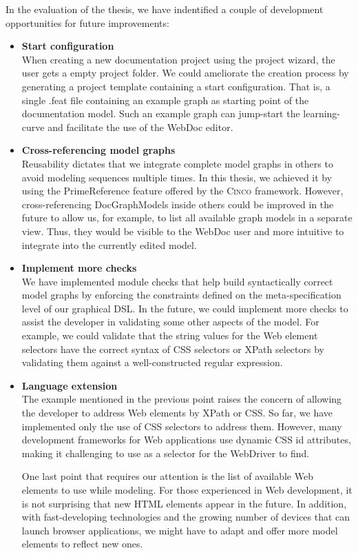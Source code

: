 In the evaluation of the thesis, we have indentified a couple of development opportunities for future improvements:
\begin{itemize}
    \item \textbf{Start configuration}\\
        When creating a new documentation project using the project wizard, the user gets a empty project folder. We could ameliorate the creation process by generating a project template containing a start configuration. That is, a single .feat file containing an example graph as starting point of the documentation model. Such an example graph can jump-start the learning-curve and facilitate the use of the WebDoc editor.
    \item \textbf{Cross-referencing model graphs}\\
        Reusability dictates that we integrate complete model graphs in others to avoid modeling sequences multiple times. In this thesis, we achieved it by using the PrimeReference feature offered by the \textsc{Cinco} framework. However, cross-referencing DocGraphModels inside others could be improved in the future to allow us, for example, to list all available graph models in a separate view. Thus, they would be visible to the WebDoc user and more intuitive to integrate into the currently edited model.
    \item \textbf{Implement more checks}\\
        We have implemented module checks that help build syntactically correct model graphs by enforcing the constraints defined on the meta-specification level of our graphical DSL. In the future, we could implement more checks to assist the developer in validating some other aspects of the model. For example, we could validate that the string values for the Web element selectors have the correct syntax of CSS selectors or XPath selectors by validating them against a well-constructed regular expression.
    \item \textbf{Language extension}\\
        The example mentioned in the previous point raises the concern of allowing the developer to address Web elements by XPath or CSS. So far, we have implemented only the use of CSS selectors to address them. However, many development frameworks for Web applications use dynamic CSS id attributes, making it challenging to use as a selector for the WebDriver to find. 

        One last point that requires our attention is the list of available Web elements to use while modeling. For those experienced in Web development, it is not surprising that new HTML elements appear in the future. In addition, with fast-developing technologies and the growing number of devices that can launch browser applications, we might have to adapt and offer more model elements to reflect new ones.
\end{itemize}
